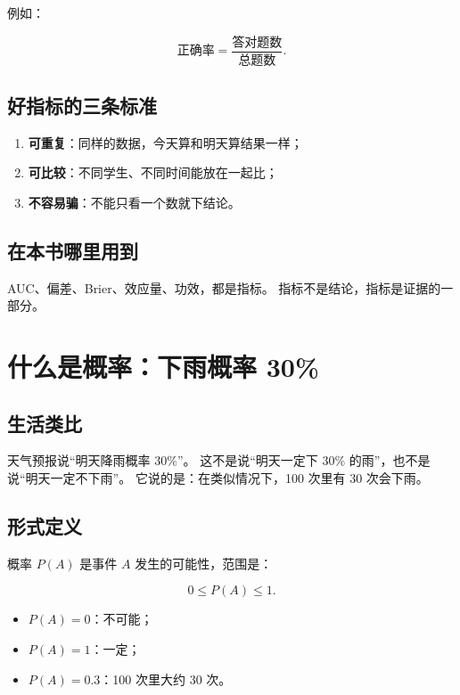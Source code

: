 \documentclass[UTF8,a4paper,11pt]{ctexart}
\begin{document}
例如：

\begin{equation}
\text{正确率}=\frac{\text{答对题数}}{\text{总题数}}.
\end{equation}

\subsection{好指标的三条标准}

\begin{enumerate}[leftmargin=2em]
\item \textbf{可重复}：同样的数据，今天算和明天算结果一样；
\item \textbf{可比较}：不同学生、不同时间能放在一起比；
\item \textbf{不容易骗}：不能只看一个数就下结论。
\end{enumerate}

\subsection{在本书哪里用到}

AUC、偏差、Brier、效应量、功效，都是指标。
指标不是结论，指标是证据的一部分。


\section{什么是概率：下雨概率 30\%}

\subsection{生活类比}

天气预报说“明天降雨概率 30\%”。
这不是说“明天一定下 30\% 的雨”，也不是说“明天一定不下雨”。
它说的是：在类似情况下，100 次里有 30 次会下雨。

\subsection{形式定义}

概率 $P(A)$ 是事件 $A$ 发生的可能性，范围是：

\begin{equation}
0\le P(A)\le 1.
\end{equation}

\begin{itemize}[leftmargin=2em]
\item $P(A)=0$：不可能；
\item $P(A)=1$：一定；
\item $P(A)=0.3$：100 次里大约 30 次。
\end{itemize}
\end{document}
